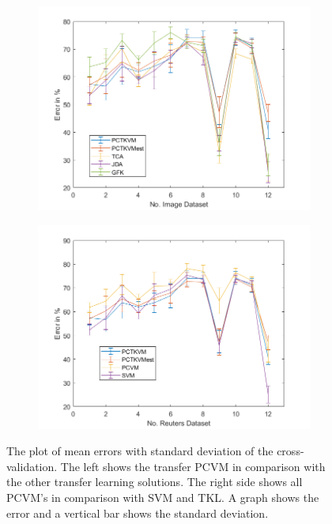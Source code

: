 \begin{figure}
	\centering
	\begin{subfigure}{.5\textwidth}
		\centering
		\includegraphics[width=1\linewidth]{figures/FiveTwoImageTL.png}
		\caption{\label{FigErrorImgTL}}
	\end{subfigure}%
	\begin{subfigure}{.5\textwidth}
		\centering
		\includegraphics[width=1\linewidth]{figures/PerformanceImage.png}
		\caption{\label{FigErrorImgO}}
	\end{subfigure}
	\caption[Plot of mean Error and standard Deviation on Image Dataset]{The plot of mean errors with standard deviation of the cross-validation. The left shows the transfer \acs{PCVM} in comparison with the other transfer learning solutions. The right side shows all \acs{PCVM}'s in comparison with \acs{SVM} and \acs{TKL}. A graph shows the error and a vertical bar shows the standard deviation. \label{FigErrorImgDatasetsB}}
\end{figure}

